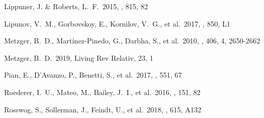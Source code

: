 \documentclass[twocolumn]{aastex63}
\begin{document}
\begin{thebibliography}{}

 Lippuner, J. \& Roberts, L.~F.\ 2015, \apj, 815, 82


 Lipunov, V.~M., Gorbovskoy, E., Kornilov, V.~G., et al.\ 2017, \apjl, 850, L1



 Metzger, B.~D., Mart{\'i}nez-Pinedo, G., Darbha, S., et al.\ 2010, \mnras, 406, 4, 2650-2662


 Metzger, B.~D.\ 2019, Living Rev Relativ, 23, 1

 Pian, E., D'Avanzo, P., Benetti, S., et al.\ 2017, \nat, 551, 67



 Roederer, I.~U., Mateo, M., Bailey, J.~I., et al.\ 2016, \aj, 151, 82




 Rosswog, S., Sollerman, J., Feindt, U., et al.\ 2018, \aap, 615, A132




\end{thebibliography}
\end{document}
